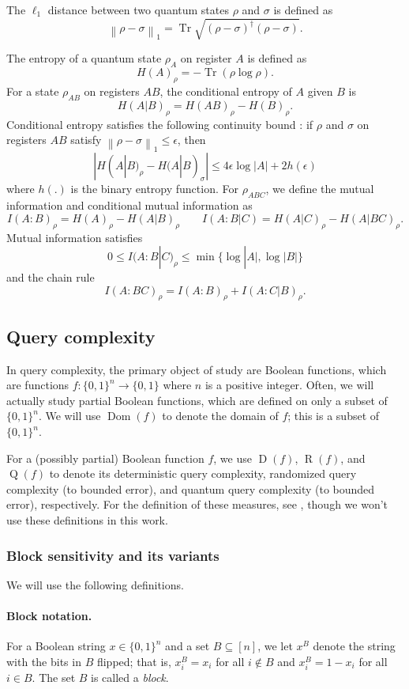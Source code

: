 \documentclass[10pt,a4paper]{article}
\theoremstyle{definition}
\DeclareMathOperator{\Dom}{Dom}
\newcommand{\B}{\{0,1\}}
\renewcommand{\>}{\rangle}
\newcommand{\<}{\langle}
\DeclareMathOperator{\Tr}{Tr}
\newcommand{\norm}[1]{{\left\lVert#1\right\rVert}}
\DeclareMathOperator{\D}{D}
\DeclareMathOperator{\R}{R}
\DeclareMathOperator{\Q}{Q}
\begin{document}
The $\ell_1$ distance between two quantum states $\rho$ and $\sigma$ is defined as
\[ \norm{\rho-\sigma}_1 = \Tr\sqrt{(\rho-\sigma)^\dagger(\rho-\sigma)}.\]

The entropy of a quantum state $\rho_A$ on register $A$ is defined as
\[H(A)_\rho = -\Tr(\rho\log\rho).\]
For a state $\rho_{AB}$ on registers $AB$, the conditional entropy of $A$ given $B$ is
\[ H(A|B)_\rho = H(AB)_\rho - H(B)_\rho.\]
Conditional entropy satisfies the following continuity bound \cite{AF04}: if $\rho$ and $\sigma$ on registers $AB$ satisfy $\norm{\rho-\sigma}_1 \leq \epsilon$, then
\[ |H(A|B)_\rho - H(A|B)_\sigma| \leq 4\epsilon\log|A| + 2h(\epsilon) \]
where $h(.)$ is the binary entropy function.
For $\rho_{ABC}$, we define the mutual information and conditional mutual information as
\[ I(A:B)_\rho = H(A)_\rho - H(A|B)_\rho \qquad I(A:B|C) = H(A|C)_\rho - H(A|BC)_\rho. \]
Mutual information satisfies
\[ 0 \leq I(A:B|C)_\rho \leq \min\{\log|A|,\log|B|\}\]
and the chain rule
\[ I(A:BC)_\rho = I(A:B)_\rho + I(A:C|B)_\rho.\]


\subsection{Query complexity}\label{sec:prelim_query}

In query complexity, the primary object of study
are Boolean functions, which are functions
$f\colon\B^n\to\B$ where $n$ is a positive integer. Often,
we will actually study partial Boolean functions, which
are defined on only a subset of $\B^n$. We will use
$\Dom(f)$ to denote the domain of $f$; this is a subset
of $\B^n$.

For a (possibly partial) Boolean function $f$, we use
$\D(f)$, $\R(f)$, and $\Q(f)$ to denote its deterministic
query complexity, randomized query complexity (to bounded error),
and quantum query complexity (to bounded error), respectively.
For the definition of these measures, see \cite{BdW02},
though we won't use these definitions in this work.

\subsubsection{Block sensitivity and its variants}

We will use the following definitions.

\paragraph{Block notation.} For a Boolean string $x\in\B^n$
and a set $B\subseteq[n]$, we let $x^B$ denote the
string with the bits in $B$ flipped; that is,
$x^B_i=x_i$ for all $i\notin B$ and $x^B_i=1-x_i$ for all $i\in B$.
The set $B$ is called a \emph{block}.
\end{document}

